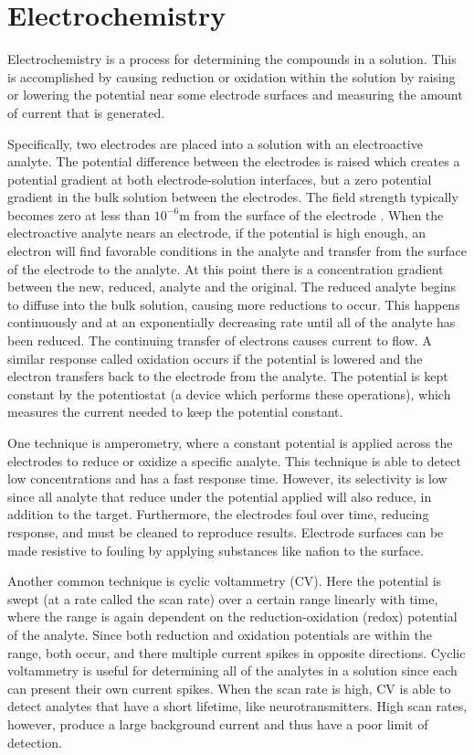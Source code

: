 \chapter{Electrochemistry}

Electrochemistry is a process for determining the compounds in a solution. This is accomplished by causing reduction or oxidation within the solution by raising or lowering the potential near some electrode surfaces and measuring the amount of current that is generated.

Specifically, two electrodes are placed into a solution with an electroactive analyte. The potential difference between the electrodes is raised which creates a potential gradient at both electrode-solution interfaces, but a zero potential gradient in the bulk solution between the electrodes. The field strength typically becomes zero at less than $10^{-6}\mathrm{m}$ from the surface of the electrode \cite{kissinger}. When the electroactive analyte nears an electrode, if the potential is high enough, an electron will find favorable conditions in the analyte and transfer from the surface of the electrode to the analyte. At this point there is a concentration gradient between the new, reduced, analyte and the original. The reduced analyte begins to diffuse into the bulk solution, causing more reductions to occur. This happens continuously and at an exponentially decreasing rate until all of the analyte has been reduced. The continuing transfer of electrons causes current to flow. A similar response called oxidation occurs if the potential is lowered and the electron transfers back to the electrode from the analyte. The potential is kept constant by the potentiostat (a device which performs these operations), which measures the current needed to keep the potential constant.

One technique is amperometry, where a constant potential is applied across the electrodes to reduce or oxidize a specific analyte. This technique is able to detect low concentrations and has a fast response time. However, its selectivity is low since all analyte that reduce under the potential applied will also reduce, in addition to the target. Furthermore, the electrodes foul over time, reducing response, and must be cleaned to reproduce results. Electrode surfaces can be made resistive to fouling by applying substances like nafion to the surface.

Another common technique is cyclic voltammetry (CV). Here the potential is swept (at a rate called the scan rate) over a certain range linearly with time, where the range is again dependent on the reduction-oxidation (redox) potential of the analyte. Since both reduction and oxidation potentials are within the range, both occur, and there multiple current spikes in opposite directions. Cyclic voltammetry is useful for determining all of the analytes in a solution since each can present their own current spikes. When the scan rate is high, CV is able to detect analytes that have a short lifetime, like neurotransmitters. High scan rates, however, produce a large background current and thus have a poor limit of detection.